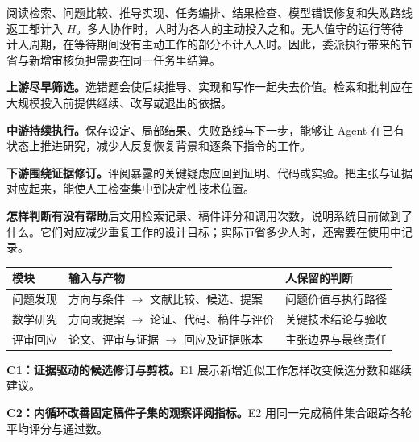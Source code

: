 阅读检索、问题比较、推导实现、任务编排、结果检查、模型错误修复和失败路线返工都计入 $H$。多人协作时，人时为各人的主动投入之和。无人值守的运行等待计入周期，在等待期间没有主动工作的部分不计入人时。因此，委派执行带来的节省与新增审核负担需要在同一任务里结算。

\textbf{上游尽早筛选。}选错题会使后续推导、实现和写作一起失去价值。检索和批判应在大规模投入前提供继续、改写或退出的依据。

\textbf{中游持续执行。}保存设定、局部结果、失败路线与下一步，能够让 Agent 在已有状态上推进研究，减少人反复恢复背景和逐条下指令的工作。

\textbf{下游围绕证据修订。}评阅暴露的关键疑虑应回到证明、代码或实验。把主张与证据对应起来，能使人工检查集中到决定性技术位置。

\begin{insight}
\textbf{怎样判断有没有帮助}\quad 后文用检索记录、稿件评分和调用次数，说明系统目前做到了什么。它们对应减少重复工作的设计目标；实际节省多少人时，还需要在使用中记录。
\end{insight}

\begin{center}\small
\begin{tabularx}{\textwidth}{P{27mm}Y Y}
\toprule
\textbf{模块} & \textbf{输入与产物} & \textbf{人保留的判断}\\
\midrule
问题发现 & 方向与条件 $\to$ 文献比较、候选、提案 & 问题价值与执行路径\\
数学研究 & 方向或提案 $\to$ 论证、代码、稿件与评价 & 关键技术结论与验收\\
评审回应 & 论文、评审与证据 $\to$ 回应及证据账本 & 主张边界与最终责任\\
\bottomrule
\end{tabularx}
\end{center}

\textbf{C1：证据驱动的候选修订与剪枝。}E1 展示新增近似工作怎样改变候选分数和继续建议。

\textbf{C2：内循环改善固定稿件子集的观察评阅指标。}E2 用同一完成稿件集合跟踪各轮平均评分与通过数。

